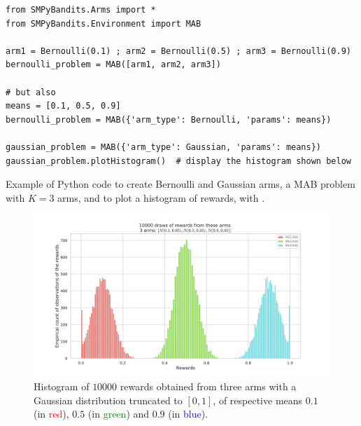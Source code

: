 \begin{small}
\begin{listing}[h!]
    \begin{verbatim}
from SMPyBandits.Arms import *
from SMPyBandits.Environment import MAB

arm1 = Bernoulli(0.1) ; arm2 = Bernoulli(0.5) ; arm3 = Bernoulli(0.9)
bernoulli_problem = MAB([arm1, arm2, arm3])

# but also
means = [0.1, 0.5, 0.9]
bernoulli_problem = MAB({'arm_type': Bernoulli, 'params': means})

gaussian_problem = MAB({'arm_type': Gaussian, 'params': means})
gaussian_problem.plotHistogram()  # display the histogram shown below
    \end{verbatim}
    \caption{Example of Python code to create Bernoulli and Gaussian arms, a MAB problem with $K=3$ arms, and to plot a histogram of rewards, with \SMPyBandits.}
    \label{lst:3:pythonCodeCreateProblem}
\end{listing}
\end{small}

\begin{figure}[h!]  %
	\centering
	\includegraphics[width=0.82\linewidth]{exampleOfRewards.pdf}
	\caption[Histogram of $10000$ \iid{} rewards obtained from three arms with a truncated Gaussian distribution, of respective means $0.1$, $0.5$ and $0.9$.]{Histogram of $10000$ \iid{} rewards obtained from three arms with a Gaussian distribution truncated to $[0,1]$, of respective means $0.1$ (in \textcolor{red}{red}), $0.5$ (in \textcolor{green}{green}) and $0.9$ (in \textcolor{blue}{blue}).}
	\label{fig:3:exampleOfRewards}
\end{figure}

